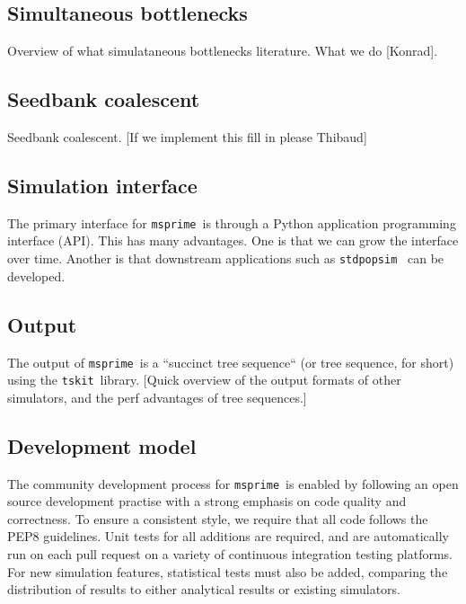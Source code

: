 \documentclass{article}
\newcommand{\msprime}[0]{\texttt{msprime}}
\newcommand{\tskit}[0]{\texttt{tskit}}
\newcommand{\msprime}[0]{{\texttt{msprime} }}
\newcommand{\tskit}[0]{{\texttt{tskit} }}
\begin{document}
\subsection*{Simultaneous bottlenecks}
Overview of what simulataneous bottlenecks literature. What we
do [Konrad].


\subsection*{Seedbank coalescent}
Seedbank coalescent. [If we implement this fill in please Thibaud]

\subsection*{Simulation interface}
The primary interface for \msprime\ is through a Python application
programming interface (API). This has many advantages. One is
that we can grow the interface over time. Another is that
downstream applications such as \texttt{stdpopsim}~\citep{adrion2019community}
can be developed.

\subsection*{Output}
The output of \msprime\ is a ``succinct tree sequence`` (or tree sequence,
for short) using the \tskit\ library. [Quick overview of the output formats
of other simulators, and the perf advantages of tree sequences.]

\subsection*{Development model}
The community development process for \msprime\ is enabled by following an
open source development practise with a strong emphasis on code quality
and correctness. To ensure a consistent style, we require that all code
follows the PEP8 guidelines. Unit tests for all additions are required, and
are automatically run on each pull request on a variety of continuous
integration testing platforms. For new simulation features, statistical tests
must also be added, comparing the distribution of results to either analytical
results or existing simulators.
\end{document}
